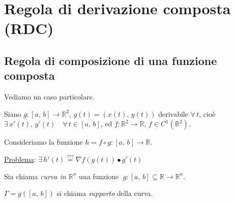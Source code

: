 \section{Regola di derivazione composta (RDC)}

\subsection{Regola di composizione di una funzione composta}
Vediamo un caso particolare.

Siano $g:[a,\,b] \longrightarrow \mathbb{R}^2$, $g(t) = (x(t),\,y(t))$ derivabile $\forall \, t$, cioè $\exists \, x'(t), \, y'(t) \quad \forall \, t \in [a,\,b]$, ed $f: \mathbb{R}^2 \longrightarrow \mathbb{R}$, $f \in C^1(\mathbb{R}^2)$.

Consideriamo la funzione $h = f \circ g : [a,\,b] \longrightarrow \mathbb{R}$.

\underline{Problema}: $\exists \, h'(t) \overset{???}{=} \nabla f(g(t)) \bullet g'(t)$

\begin{definition}
Sia chiama \emph{curva in $\mathbb{R}^n$} una funzione $\; g : [a,\,b] \subseteq \mathbb{R} \longrightarrow \mathbb{R}^n$.

$\Gamma = g([a,\,b])$ si chiama \emph{supporto} della curva.
\end{definition}

